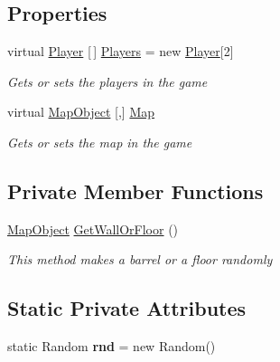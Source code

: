 \subsection*{Properties}
\begin{DoxyCompactItemize}
\item 
virtual \mbox{\hyperlink{class_bomberman_1_1_model_1_1_player}{Player}} \mbox{[}$\,$\mbox{]} \mbox{\hyperlink{class_bomberman_1_1_business_logic_1_1_game_model_a558c278098b639d6b16e3495ed9a2202}{Players}} = new \mbox{\hyperlink{class_bomberman_1_1_model_1_1_player}{Player}}\mbox{[}2\mbox{]}
\begin{DoxyCompactList}\small\item\em Gets or sets the players in the game \end{DoxyCompactList}\item 
virtual \mbox{\hyperlink{class_bomberman_1_1_model_1_1_map_object}{Map\+Object}} \mbox{[},\mbox{]} \mbox{\hyperlink{class_bomberman_1_1_business_logic_1_1_game_model_a2dab17c97f5ac55f447bf915ea67f4be}{Map}}
\begin{DoxyCompactList}\small\item\em Gets or sets the map in the game \end{DoxyCompactList}\end{DoxyCompactItemize}
\subsection*{Private Member Functions}
\begin{DoxyCompactItemize}
\item 
\mbox{\hyperlink{class_bomberman_1_1_model_1_1_map_object}{Map\+Object}} \mbox{\hyperlink{class_bomberman_1_1_business_logic_1_1_game_model_ae901c4a65a88329263aab41f5670b29d}{Get\+Wall\+Or\+Floor}} ()
\begin{DoxyCompactList}\small\item\em This method makes a barrel or a floor randomly \end{DoxyCompactList}\end{DoxyCompactItemize}
\subsection*{Static Private Attributes}
\begin{DoxyCompactItemize}
\item 
\mbox{\label{class_bomberman_1_1_business_logic_1_1_game_model_a9f3de2718c1596fab4b526b312577b8d}} 
static Random {\bfseries rnd} = new Random()
\end{DoxyCompactItemize}


